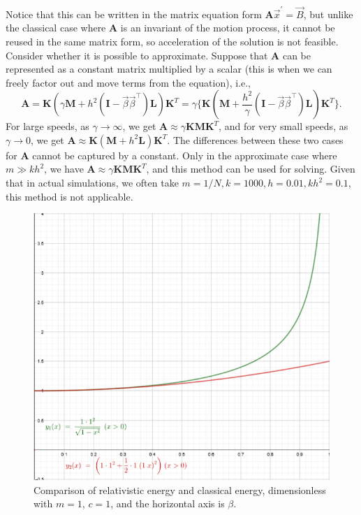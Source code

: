 \documentclass{article}
\begin{document}
Notice that this can be written in the matrix equation form $ \mathbf{A} \vec{x}^{'} = \vec{B} $, but unlike the classical case where $ \mathbf{A} $ is an invariant of the motion process, it cannot be reused in the same matrix form, so acceleration of the solution is not feasible. Consider whether it is possible to approximate. Suppose that $\mathbf{A}$ can be represented as a constant matrix multiplied by a scalar (this is when we can freely factor out and move terms from the equation), i.e., 
$$ \mathbf{A} = \mathbf{K} (\gamma \mathbf{M} + h^2 (\mathbf{I} - \vec{\beta} \vec{\beta}^\top) \mathbf{L}) \mathbf{K}^{T} = \gamma \{ \mathbf{K} (\mathbf{M} + \frac{h^2}{\gamma} (\mathbf{I} - \vec{\beta} \vec{\beta}^\top) \mathbf{L}) \mathbf{K}^{T} \}. $$
For large speeds, as $\gamma \to \infty$, we get $\mathbf{A} \approx \gamma \mathbf{K} \mathbf{M} \mathbf{K}^{T}$, and for very small speeds, as $\gamma \to 0$, we get $\mathbf{A} \approx \mathbf{K} (\mathbf{M} + h^2 \mathbf{L}) \mathbf{K}^{T}$. The differences between these two cases for $\mathbf{A}$ cannot be captured by a constant. Only in the approximate case where $ m \gg k h^2 $, we have $ \mathbf{A} \approx \gamma \mathbf{K} \mathbf{M} \mathbf{K}^{T} $, and this method can be used for solving. Given that in actual simulations, we often take $ m = 1 / N, k = 1000, h = 0.01, k h^2 = 0.1 $, this method is not applicable.

\begin{figure}[htbp]
    \centering
    \setlength{\abovecaptionskip}{0.cm}
    \includegraphics[width=0.6\linewidth]{energy.png}
    \caption{Comparison of relativistic energy and classical energy, dimensionless with $m = 1$, $c = 1$, and the horizontal axis is $\beta$.}
    \label{energy}
\end{figure}
\end{document}
